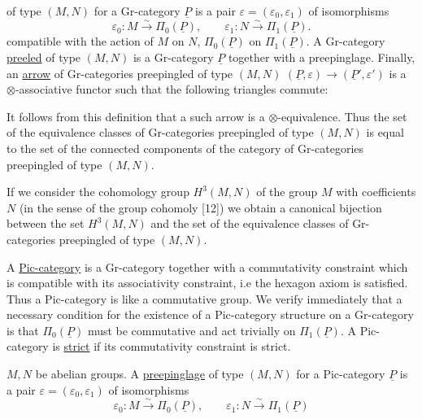 of type $(M,N)$ for a Gr-category $\underline{P}$ is a pair $\varepsilon=(\varepsilon_0,\varepsilon_1)$ of isomorphisms
\[
\varepsilon_0:M\xrightarrow{\sim}\Pi_0(\underline P),\qquad
\varepsilon_1:N\xrightarrow{\sim}\Pi_1(\underline P).
\]
compatible with the action of $M$ on $N$, $\Pi_0(\underline P)$ on $\Pi_1(\underline P)$. A Gr-category \margin{!}\uline{pree\mbox{}led} of type $(M,N)$ is a Gr-category $\underline P$ together with a preepinglage. Finally, an \uline{arrow} of Gr-categories preepingled of type $(M,N)$ $(\underline P,\varepsilon)\to(\underline P',\varepsilon')$ is a $\otimes$-associative functor such that the following triangles commute:

It follows from this definition that a such arrow is a $\otimes$-equivalence. Thus the set of the equivalence classes of Gr-categories preepingled of type $(M,N)$ is equal to the set of the connected components of the category of Gr-categories preepingled of type $(M,N)$.

If we consider the cohomology group $H^3(M,N)$ of the group $M$ with coefficients $N$ (in the sense of the group cohomoly  [12]) we obtain a canonical bijection between the set $H^3(M,N)$ and the set of the equivalence classes of Gr-categories preepingled of type $(M,N)$.

A \uline{Pic-category} is a Gr-category together with a commutativity constraint which is compatible with its associativity constraint, i.e the hexagon axiom is satisfied. Thus a Pic-category is like a commutative group. We verify immediately that a necessary condition for the existence of a Pic-category structure on a Gr-category is that $\Pi_0(\underline P)$ must be commutative and act trivially on $\Pi_1(\underline P)$. A Pic-category is \uline{strict} if its commutativity constraint is strict.

 $M,N$ be abelian groups. A \uline{preepinglage} of type $(M,N)$ for a Pic-category $\underline P$ is a pair $\varepsilon=(\varepsilon_0,\varepsilon_1)$ of isomorphisms
\[
\varepsilon_0:M\xrightarrow{\sim}\Pi_0(\underline P),\qquad
\varepsilon_1:N\xrightarrow{\sim}\Pi_1(\underline P)
\]
